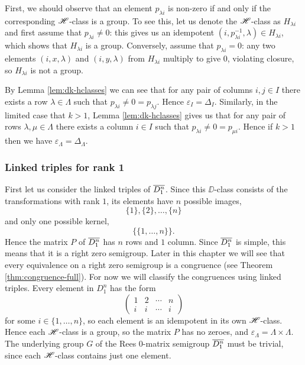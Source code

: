 First, we should observe that an element $p_{\lambda i}$ is non-zero if and only
if the corresponding $\mathscr{H}$-class is a group.  To see this, let us denote the
$\mathscr{H}$-class as $H_{\lambda i}$ and first assume that $p_{\lambda i} \neq 0$:
this gives us an idempotent
$(i, p_{\lambda i}^{-1}, \lambda) \in H_{\lambda i}$, which shows that
$H_{\lambda i}$ is a group.  Conversely, assume that $p_{\lambda i} = 0$: any
two elements $(i, x, \lambda)$ and $(i, y, \lambda)$ from $H_{\lambda i}$
multiply to give $0$, violating closure, so $H_{\lambda i}$ is not a group.

By Lemma \ref{lem:dk-hclasses} we can see
that for any pair of columns $i,j \in I$ there exists a row
$\lambda \in \Lambda$ such that $p_{\lambda i} \neq 0 = p_{\lambda j}$.  Hence
$\varepsilon_I = \Delta_I$.  Similarly, in the limited case that $k>1$, Lemma
\ref{lem:dk-hclasses} gives us that for any pair of rows
$\lambda, \mu \in \Lambda$ there exists a column $i \in I$ such that
$p_{\lambda i} \neq 0 = p_{\mu i}$.  Hence if $k>1$ then we have
$\varepsilon_\Lambda = \Delta_\Lambda$.

\subsubsection{Linked triples for rank 1}
\label{sec:k1}
First let us consider the linked triples of $\overline{D_1^n}$.  Since this
$\DD$-class consists of the transformations with rank $1$, its elements have $n$
possible images,
$$\{1\}, \{2\}, \dots, \{n\}$$
and only one possible kernel,
$$\big\{\{1, \dots, n\}\big\}.$$
Hence the matrix $P$ of $\overline{D_1^n}$ has $n$ rows and $1$ column.  Since
$\overline{D_1^n}$ is simple, this means that it is a right zero semigroup.  Later in
this chapter we will see that every equivalence on a right zero semigroup is a
congruence (see Theorem \ref{thm:congruence-full}).  For now we will classify
the congruences using linked triples.  Every element in $D_1^n$ has the form
$$\begin{pmatrix}
  1 & 2 & \cdots & n \\
  i & i & \cdots & i
\end{pmatrix}$$ for some $i \in \{1, \dots, n\}$, so each element is an
idempotent in its own $\mathrel{\mathscr{H}}$-class.  Hence each $\mathrel{\mathscr{H}}$-class is a group, so the
matrix $P$ has no zeroes, and $\varepsilon_\Lambda = \Lambda \times \Lambda$.
The underlying group $G$ of the Rees 0-matrix semigroup $\overline{D_1^n}$ must be
trivial, since each $\mathrel{\mathscr{H}}$-class contains just one element.


